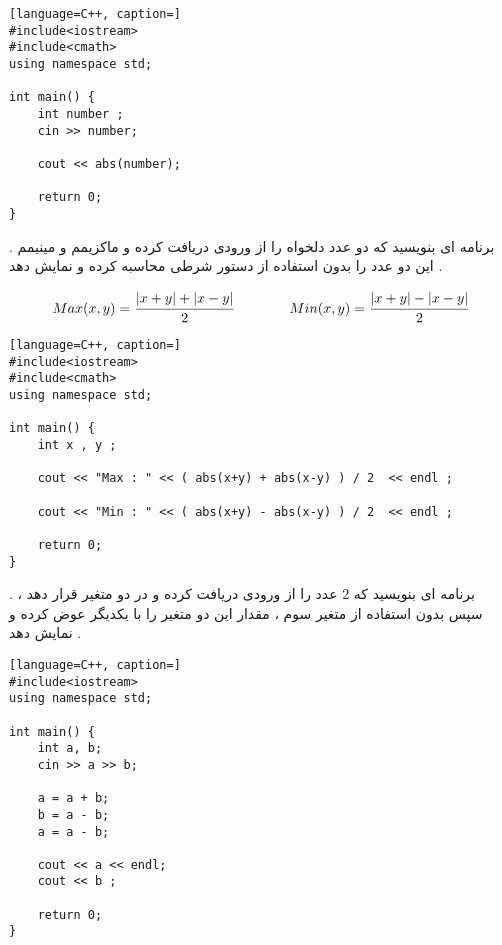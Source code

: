 \documentclass[12pt]{article}
\begin{document}
\begin{latin}
\begin{lstlisting}[language=C++, caption=]
#include<iostream>
#include<cmath>
using namespace std;

int main() {
	int number ; 
	cin >> number;
	
	cout << abs(number);
	
	return 0;
}
\end{lstlisting}
\end{latin}



 . برنامه ای بنویسید که دو عدد دلخواه را از ورودی دریافت کرده و ماکزیمم و مینیمم این دو عدد را بدون استفاده از دستور شرطی
محاسبه کرده و نمایش دهد .


\begin{align*}
Max(x,y) = \cfrac{|x+y| + |x-y|}{2} \qquad \qquad
Min(x,y) = \cfrac{|x+y| - |x-y|}{2}
\end{align*}



\begin{latin}
\begin{lstlisting}[language=C++, caption=]
#include<iostream>
#include<cmath>
using namespace std;

int main() {
	int x , y ;
	
	cout << "Max : " << ( abs(x+y) + abs(x-y) ) / 2  << endl ;
	
	cout << "Min : " << ( abs(x+y) - abs(x-y) ) / 2  << endl ;
	
	return 0;
}
\end{lstlisting}
\end{latin}





 . برنامه ای بنویسید که 2 عدد را از ورودی دریافت کرده و در دو متغیر قرار دهد ، سپس بدون استفاده از متغیر سوم ، مقدار این دو متغیر را با یکدیگر عوض کرده و نمایش دهد .





\begin{latin}
\begin{lstlisting}[language=C++, caption=]
#include<iostream>
using namespace std;

int main() {
	int a, b;
    cin >> a >> b;
    
    a = a + b;
    b = a - b;
    a = a - b;
    
    cout << a << endl;
    cout << b ;
    
	return 0;
}
\end{lstlisting}
\end{latin}
\end{document}
